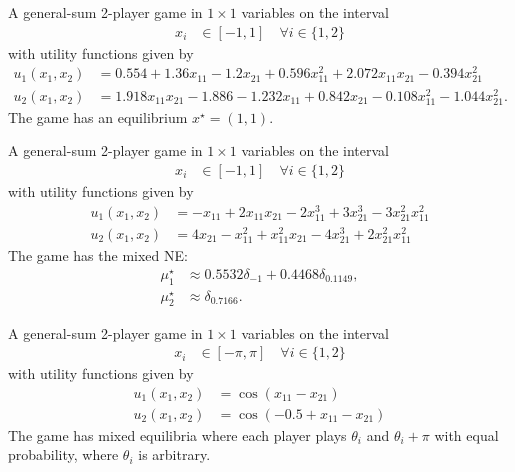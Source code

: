\begin{game}\label{ex.stein07.4.3.1}
A general-sum 2-player game in $1 \times 1$ variables on the interval
\begin{align*}
    x_i &\in [-1,1] \quad \forall i \in \{1,2\}
\end{align*}
with utility functions \cite[Example~3.1]{stein07} given by
\begin{align*}
u_{1}\left( x_{1}, x_{2} \right) &= 0.554 + 1.36 x_{11} - 1.2 x_{21} + 0.596 x_{11}^{2} + 2.072 x_{11} x_{21} - 0.394 x_{21}^{2} \\
u_{2}\left( x_{1}, x_{2} \right) &= 1.918 x_{11} x_{21} -1.886 - 1.232 x_{11} + 0.842 x_{21} - 0.108 x_{11}^{2} - 1.044 x_{21}^{2}.
\end{align*}
The game has an equilibrium $x^\star=(1,1)$.
\end{game}


\begin{game}\label{ex.stein08.2.3}
A general-sum 2-player game in $1 \times 1$ variables on the interval
\begin{align*}
    x_i &\in [-1,1] \quad \forall i \in \{1,2\}
\end{align*}
with utility functions \cite[Example~2.3]{stein.ozdaglar.ea:separable} given by
\begin{align*}
u_{1}\left( x_{1}, x_{2} \right) &=  - x_{11} + 2 x_{11} x_{21} - 2 x_{11}^{3} + 3 x_{21}^{3} - 3 x_{21}^{2} x_{11}^{2} \\
u_{2}\left( x_{1}, x_{2} \right) &= 4 x_{21} - x_{11}^{2} + x_{11}^{2} x_{21} - 4 x_{21}^{3} + 2 x_{21}^{2} x_{11}^{2}
\end{align*}
The game has the mixed NE:
\begin{align*}
\mu_1^\star &\approx 0.5532\delta_{-1} + 0.4468\delta_{0.1149}, \\
\mu_2^\star &\approx \delta_{0.7166}.
\end{align*}
\end{game}

\begin{game}\label{ex.stein08.2.4}
A general-sum 2-player game in $1 \times 1$ variables on the interval
\begin{align*}
    x_i &\in [-\pi,\pi] \quad \forall i \in \{1,2\}
\end{align*}
with utility functions \cite[Example~2.4]{stein.ozdaglar.ea:separable} given by
\begin{align*}
u_{1}\left( x_{1}, x_{2} \right) &= \cos\left( x_{11} - x_{21} \right) \\
u_{2}\left( x_{1}, x_{2} \right) &= \cos\left( -0.5 + x_{11} - x_{21} \right)
\end{align*}
The game has mixed equilibria where each player plays $\theta_i$ and $\theta_i + \pi$ with equal probability, where $\theta_i$ is arbitrary.
\end{game}

